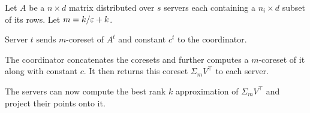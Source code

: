 \documentclass{article}
\begin{document}
\begin{defi}
    Let $A$ be a $n\times d$ matrix distributed over $s$ servers each containing a $n_i \times d$ subset of its rows. Let $m = k/\varepsilon +k$. 
    \begin{enum}
        \item Server $t$ sends $m$-coreset of $A^t $ and constant $c^t $ to the coordinator. 
        \item The coordinator concatenates the coresets and further computes a $m$-coreset of it along with constant $c$. It then returns this coreset $\Sigma _m V^{\top}  $ to each server. 
        \item The servers can now compute the best rank $k$ approximation of $\Sigma _m V^{\top} $ and project their points onto it. 
    \end{enum}
\end{defi}


\end{document}
